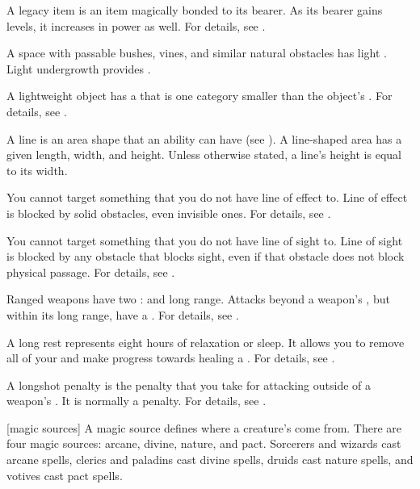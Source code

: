  A legacy item is an item magically bonded to its bearer.
As its bearer gains levels, it increases in power as well.
For details, see .

 A space with passable bushes, vines, and similar natural obstacles has light .
Light undergrowth provides .

 A lightweight object has a  that is one category smaller than the object's .
For details, see .

 A line is an area shape that an ability can have (see ).
A line-shaped area has a given length, width, and height.
Unless otherwise stated, a line's height is equal to its width.

 You cannot target something that you do not have line of effect to.
Line of effect is blocked by solid obstacles, even invisible ones.
For details, see .

 You cannot target something that you do not have line of sight to.
Line of sight is blocked by any obstacle that blocks sight, even if that obstacle does not block physical passage.
For details, see .

 Ranged weapons have two :  and long range.
Attacks beyond a weapon's , but within its long range, have a  .
For details, see .

 A long rest represents eight hours of relaxation or sleep.
It allows you to remove all of your  and make progress towards healing a .
For details, see .

 A longshot penalty is the penalty that you take for attacking outside of a weapon's .
It is normally a   penalty.
For details, see .

[magic sources] A magic source defines where a creature's  come from.
There are four magic sources: arcane, divine, nature, and pact.
Sorcerers and wizards cast arcane spells, clerics and paladins cast divine spells, druids cast nature spells, and votives cast pact spells.

